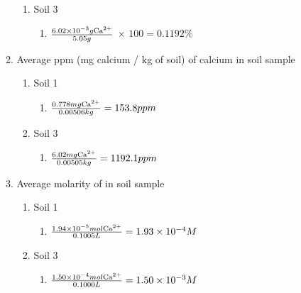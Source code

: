 \documentclass[10pt]{article}
\providecommand{\e}[1]{\ensuremath{\times 10^{#1}}}
\begin{document}
\begin{enumerate}
\begin{enumerate}
\begin{enumerate}
            \item Soil 3
            \begin{enumerate}
                \item $\frac{6.02\e{-3}g\ce{Ca^2+}}{5.05g}$ $\times$ $ 100 = 0.1192\%$
            \end{enumerate}
        \end{enumerate}
        \item Average ppm (mg calcium / kg of soil) of calcium in soil sample
        \begin{enumerate}
            \item Soil 1
            \begin{enumerate}
                \item $\frac{0.778 mg \ce{Ca^2+}}{0.00506 kg} = 153.8ppm$
            \end{enumerate}
            \item Soil 3
            \begin{enumerate}
                \item $\frac{6.02 mg \ce{Ca^2+}}{0.00505 kg} = 1192.1ppm$
            \end{enumerate}
        \end{enumerate}
        \item Average molarity of  in soil sample
        \begin{enumerate}
            \item Soil 1
            \begin{enumerate}
                \item $\frac{1.94\e{-5} mol \ce{Ca^2+}}{0.1005L} = 1.93\e{-4}M$
            \end{enumerate}
            \item Soil 3
            \begin{enumerate}
                \item $\frac{1.50\e{-4} mol \ce{Ca^2+}}{0.1000L} = 1.50\e{-3}M$
            \end{enumerate}
        \end{enumerate}
    \end{enumerate}
\end{enumerate}
\end{document}
